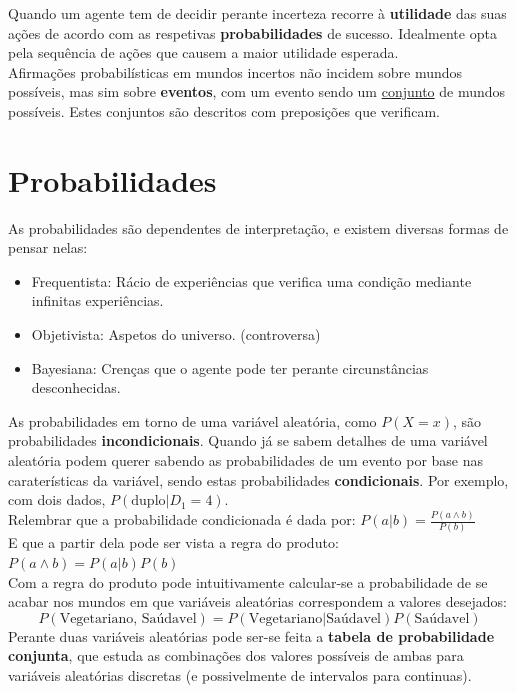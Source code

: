 \documentclass[]{report}
\begin{document}
Quando um agente tem de decidir perante incerteza recorre à \textbf{utilidade} das suas ações de acordo com as respetivas \textbf{probabilidades} de sucesso. Idealmente opta pela sequência de ações que causem a maior utilidade esperada.\\[0.2cm]
Afirmações probabilísticas em mundos incertos não incidem sobre mundos possíveis, mas sim sobre \textbf{eventos}, com um evento sendo um \underline{conjunto} de mundos possíveis. Estes conjuntos são descritos com preposições que verificam.
\section{Probabilidades}
As probabilidades são dependentes de interpretação, e existem diversas formas de pensar nelas:
\begin{itemize}
\item Frequentista: Rácio de experiências que verifica uma condição mediante infinitas experiências.
\item Objetivista: Aspetos do universo. (controversa)
\item Bayesiana: Crenças que o agente pode ter perante circunstâncias desconhecidas.
\end{itemize}
As probabilidades em torno de uma variável aleatória, como $P(X=x)$, são probabilidades \textbf{incondicionais}.
Quando já se sabem detalhes de uma variável aleatória podem querer sabendo as probabilidades de um evento por base nas caraterísticas da variável, sendo estas probabilidades \textbf{condicionais}. Por exemplo, com dois dados, $P(\text{duplo}|D_1 = 4)$.\\[0.5cm]
Relembrar que a probabilidade condicionada é dada por: $P(a|b) = \frac{P(a \wedge b)}{P(b)}$\\
E que a partir dela pode ser vista a regra do produto: $P(a \wedge b) = P(a|b)P(b)$\\[0.2cm]
Com a regra do produto pode intuitivamente calcular-se a probabilidade de se acabar nos mundos em que variáveis aleatórias correspondem a valores desejados:
$$P(\text{Vegetariano, Saúdavel}) = P(\text{Vegetariano}|\text{Saúdavel})P(\text{Saúdavel})$$
Perante duas variáveis aleatórias pode ser-se feita a \textbf{tabela de probabilidade conjunta}, que estuda as combinações dos valores possíveis de ambas para variáveis aleatórias discretas (e possivelmente de intervalos para continuas).
\end{document}
